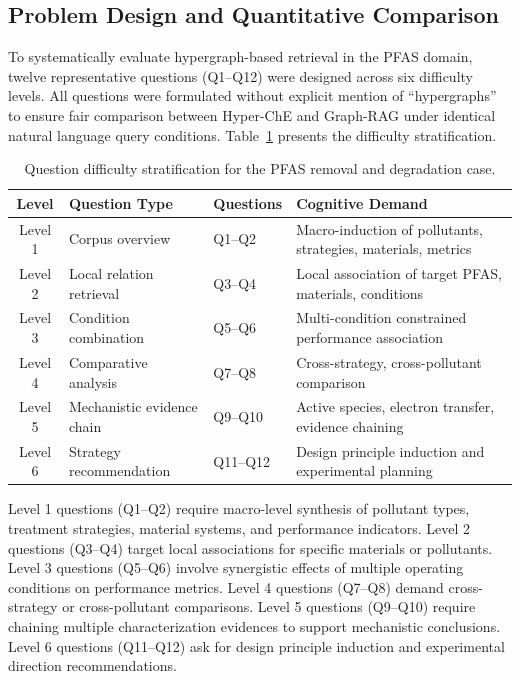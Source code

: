 \subsection{Problem Design and Quantitative Comparison}

To systematically evaluate hypergraph-based retrieval in the PFAS domain, twelve representative questions (Q1--Q12) were designed across six difficulty levels. All questions were formulated without explicit mention of ``hypergraphs'' to ensure fair comparison between Hyper-ChE and Graph-RAG under identical natural language query conditions. Table~\ref{tab:pfas_question_levels} presents the difficulty stratification.

\begin{table}[htbp]
\centering
\caption{Question difficulty stratification for the PFAS removal and degradation case.}
\label{tab:pfas_question_levels}
\begin{tabular}{@{}clll@{}}
\toprule
\textbf{Level} & \textbf{Question Type} & \textbf{Questions} & \textbf{Cognitive Demand} \\
\midrule
Level 1 & Corpus overview & Q1--Q2 & Macro-induction of pollutants, strategies, materials, metrics \\
Level 2 & Local relation retrieval & Q3--Q4 & Local association of target PFAS, materials, conditions \\
Level 3 & Condition combination & Q5--Q6 & Multi-condition constrained performance association \\
Level 4 & Comparative analysis & Q7--Q8 & Cross-strategy, cross-pollutant comparison \\
Level 5 & Mechanistic evidence chain & Q9--Q10 & Active species, electron transfer, evidence chaining \\
Level 6 & Strategy recommendation & Q11--Q12 & Design principle induction and experimental planning \\
\bottomrule
\end{tabular}
\end{table}

Level 1 questions (Q1--Q2) require macro-level synthesis of pollutant types, treatment strategies, material systems, and performance indicators. Level 2 questions (Q3--Q4) target local associations for specific materials or pollutants. Level 3 questions (Q5--Q6) involve synergistic effects of multiple operating conditions on performance metrics. Level 4 questions (Q7--Q8) demand cross-strategy or cross-pollutant comparisons. Level 5 questions (Q9--Q10) require chaining multiple characterization evidences to support mechanistic conclusions. Level 6 questions (Q11--Q12) ask for design principle induction and experimental direction recommendations.

